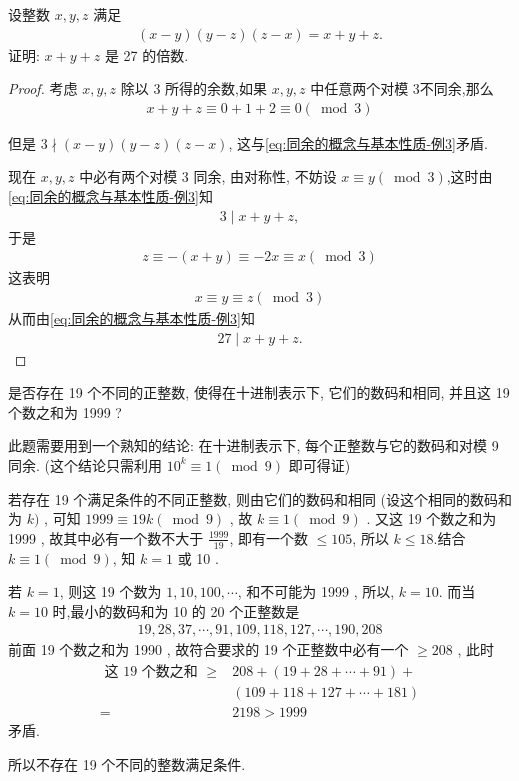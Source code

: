 \begin{example}
	设整数 $x ,  y ,  z$ 满足
	\begin{align}\label{eq:同余的概念与基本性质-例3}
		(x-y)(y-z)(z-x)=x+y+z .
	\end{align}
	证明: $x+y+z$ 是 27 的倍数.
\end{example}
\begin{proof}
	考虑 $x, y, z$ 除以 3 所得的余数,如果 $x, y, z$ 中任意两个对模 3不同余,那么
	\begin{align*}
		x+y+z \equiv 0+1+2 \equiv 0(\bmod 3)
	\end{align*}

	但是 $3 \nmid(x-y)(y-z)(z-x)$, 这与\autoref{eq:同余的概念与基本性质-例3}矛盾.

	现在 $x ,  y ,  z$ 中必有两个对模 3 同余, 由对称性, 不妨设 $x \equiv y(\bmod 3)$,这时由\autoref{eq:同余的概念与基本性质-例3}知
	\begin{align*}
		3 \mid x+y+z,
	\end{align*}
	于是
	\begin{align*}
		z \equiv-(x+y) \equiv-2 x \equiv x(\bmod 3)
	\end{align*}
	这表明
	\begin{align*}
		x \equiv y \equiv z(\bmod 3)
	\end{align*}
	从而由\autoref{eq:同余的概念与基本性质-例3}知
	\begin{align*}
		27 \mid x+y+z.
	\end{align*}
\end{proof}

\begin{example}
	是否存在 19 个不同的正整数, 使得在十进制表示下, 它们的数码和相同, 并且这 19 个数之和为 1999 ?
\end{example}
\begin{solution}
	此题需要用到一个熟知的结论: 在十进制表示下, 每个正整数与它的数码和对模 9 同余. (这个结论只需利用 $10^{k} \equiv 1(\bmod 9)$ 即可得证)

	若存在 19 个满足条件的不同正整数, 则由它们的数码和相同 (设这个相同的数码和为 $k)$ , 可知 $1999 \equiv 19 k(\bmod 9)$ , 故 $k \equiv 1(\bmod 9)$ . 又这 19 个数之和为 1999 , 故其中必有一个数不大于 $\frac{1999}{19}$, 即有一个数 $\leqslant 105$, 所以 $k \leqslant 18$.结合 $k \equiv 1(\bmod 9)$, 知 $k=1$ 或 10 .

	若 $k=1$, 则这 19 个数为 $1,10,100, \cdots$, 和不可能为 1999 , 所以, $k=10$. 而当 $k=10$ 时,最小的数码和为 10 的 20 个正整数是
	\begin{align*}
		19,28,37, \cdots, 91,109,118,127, \cdots, 190,208
	\end{align*}
	前面 19 个数之和为 1990 , 故符合要求的 19 个正整数中必有一个 $\geqslant 208$ , 此时
	\begin{align}
		\text { 这 } 19 \text { 个数之和 } \geqslant & 208+(19+28+\cdots+91)+   \\
		                                             & (109+118+127+\cdots+181) \\
		=                                            & 2198>1999
	\end{align}
	矛盾.

	所以不存在 19 个不同的整数满足条件.
\end{solution}

